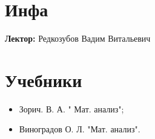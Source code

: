 %
%
%
%
%
%
%
%
%
%

\section{Инфа}
\textbf{Лектор:} Редкозубов Вадим Витальевич

\section{Учебники}
 \begin{itemize}
    \item Зорич. В. А. " Мат. анализ";
    \item Виноградов О. Л. "Мат. анализ".
 \end{itemize}

